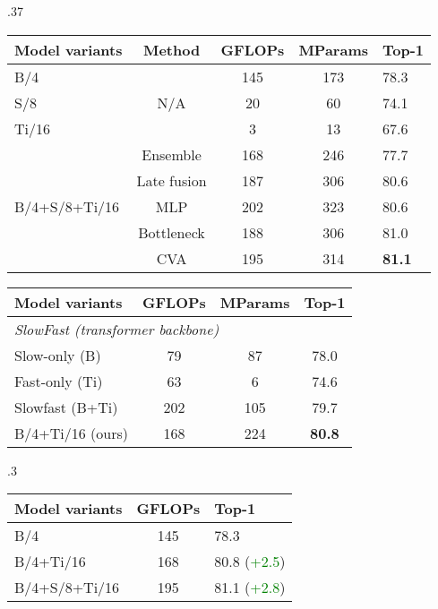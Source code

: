\begin{table*}[t]
\begin{subtable}[t]{.37\linewidth}
{\begin{tabular}{  l  c  c  c  l }
	  		    \toprule
                Model variants & Method & GFLOPs & MParams & Top-1 \\
                \midrule
                B/4 & \multirow{3}{*}{N/A} & 145 & 173 & 78.3 \\ S/8 &  & 20 & 60 & 74.1 \\ Ti/16 &  & 3 & 13 & 67.6 \\ \midrule
                \multirow{5}{*}{B/4+S/8+Ti/16} & Ensemble & 168 & 246 & 77.7   \\ & Late fusion & 187 & 306 & 80.6  \\ & MLP & 202 & 323 & 80.6  \\ & Bottleneck & 188 & 306 & 81.0  \\ 
                & CVA & 195 & 314 & \textbf{81.1}  \\ \bottomrule
    \end{tabular}
	\label{tab:fusion_methods}
  	}
    \vspace{1.05\baselineskip}
    \centering
	\scriptsize{
	\caption{Comparison to SlowFast multi-resolution method. }
	\vspace{-0.1\baselineskip}
    \begin{tabular}{  l  c  c  c }
      \toprule
      Model variants & GFLOPs & MParams & Top-1 \\
      \midrule
      \multicolumn{3}{l}{\textit{SlowFast (transformer backbone)}} \\
      Slow-only (B) & 79 & 87 & 78.0 \\ Fast-only (Ti) & 63 & 6 & 74.6 \\ Slowfast (B+Ti) & 202 & 105 & 79.7 \\ \midrule B/4+Ti/16 (ours) & 168 & 224  & \textbf{80.8} \\ \bottomrule
    \end{tabular}}
    \label{tab:slowfast}
  	\end{subtable}
  	\hfill
  	\begin{subtable}[t]{.3\linewidth}
  		\setlength{\tabcolsep}{6pt} \centering
  		\caption{Effects of increasing number of views.}
  		\vspace{-0.1\baselineskip}
  		\scriptsize{
  			\begin{tabular}{  l  c  l }
  			    \toprule
                Model variants & GFLOPs & Top-1 \\
                \midrule
                B/4 & 145 & 78.3  \\ B/4+Ti/16 & 168 & 80.8 (\textcolor{green}{+2.5}) \\ B/4+S/8+Ti/16 & 195 & 81.1 (\textcolor{green}{+2.8}) \\ \midrule

\end{tabular}}
\end{subtable}
\end{table*}

